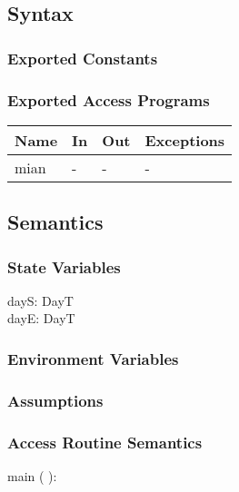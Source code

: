 \documentclass[12pt, titlepage]{article}
\begin{document}
\subsection{Syntax}

\subsubsection{Exported Constants}


\subsubsection{Exported Access Programs}

\begin{center}
\begin{tabular}{p{2cm} p{4cm} p{4cm} p{2cm}}
\hline
\textbf{Name} & \textbf{In} & \textbf{Out} & \textbf{Exceptions} \\
\hline 
mian & - & - & - \\

\hline
\end{tabular}
\end{center}


\subsection{Semantics}

\subsubsection{State Variables}
dayS: DayT\\
dayE: DayT


\subsubsection{Environment Variables}


\subsubsection{Assumptions}


\subsubsection{ Access Routine Semantics}

\noindent  main ( ):
\end{document}

